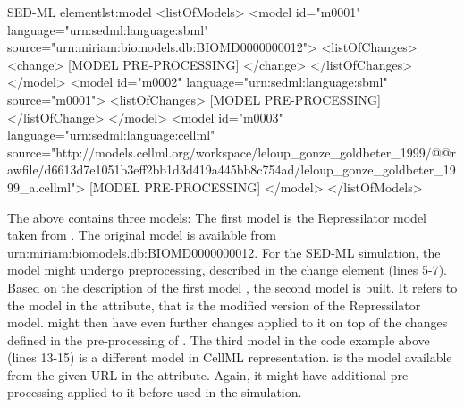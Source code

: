 %
\begin{myXmlLst}{SED-ML  element}{lst:model}
<listOfModels>
 <model id="m0001" language="urn:sedml:language:sbml" 
  source="urn:miriam:biomodels.db:BIOMD0000000012">
  <listOfChanges>
   <change>
    [MODEL PRE-PROCESSING]
   </change>
   </listOfChanges> 
 </model>
 <model id="m0002" language="urn:sedml:language:sbml" source="m0001">
  <listOfChanges>
   [MODEL PRE-PROCESSING]
  </listOfChange>
 </model>
 <model id="m0003" language="urn:sedml:language:cellml" source="http://models.cellml.org/workspace/leloup_gonze_goldbeter_1999/@@rawfile/d6613d7e1051b3eff2bb1d3d419a445bb8c754ad/leloup_gonze_goldbeter_1999_a.cellml">
  [MODEL PRE-PROCESSING]
 </model>
</listOfModels>
\end{myXmlLst} 
%

The above  contains three models: 
The first model  is the Repressilator model taken from \biom. 
The original model is available from \url{urn:miriam:biomodels.db:BIOMD0000000012}. 
For the SED-ML simulation, the model might undergo preprocessing, described in the \hyperref[class:change]{change} element (lines 5-7).
Based on the description of the first model , the second model is built. 
It refers to the model  in the  attribute, that is the modified version of the Repressilator model.
 might then have even further changes applied to it on top of the changes defined in the pre-processing of .
The third model in the code example above (lines 13-15) is a different model in CellML representation.  is the model available from the given URL in the  attribute. Again, it might have additional pre-processing applied to it before used in the simulation.

  

  


